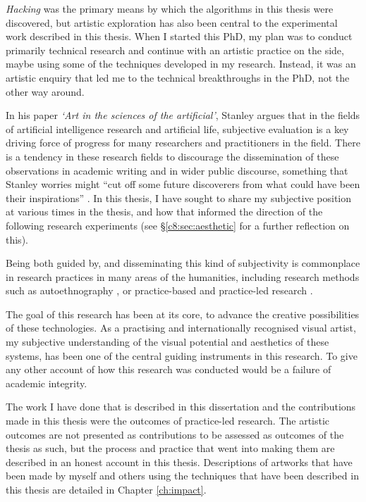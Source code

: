 \textit{Hacking} was the primary means by which the algorithms in this thesis were discovered, but artistic exploration has also been central to the experimental work described in this thesis. 
When I started this PhD, my plan was to conduct primarily technical research and continue with an artistic practice on the side, maybe using some of the techniques developed in my research. 
Instead, it was an artistic enquiry that led me to the technical breakthroughs in the PhD, not the other way around. 

In his paper \textit{`Art in the sciences of the artificial'}, Stanley argues that in the fields of artificial intelligence research and artificial life, subjective evaluation is a key driving force of progress for many researchers and practitioners in the field. 
There is a tendency in these research fields to discourage the dissemination of these observations in academic writing and in wider public discourse, something that Stanley worries might “cut off some future discoverers from what could have been their inspirations” \citep{stanley2018art}. 
In this thesis, I have sought to share my subjective position at various times in the thesis, and how that informed the direction of the following research experiments (see \S \ref{c8:sec:aesthetic} for a further reflection on this).

Being both guided by, and disseminating this kind of subjectivity is commonplace in research practices in many areas of the humanities, including research methods such as autoethnography \citep{reed1997auto}, or practice-based and practice-led research \citep{candy2006practice}. 

The goal of this research has been at its core, to advance the creative possibilities of these technologies. 
As a practising and internationally recognised visual artist, my subjective understanding of the visual potential and aesthetics of these systems, has been one of the central guiding instruments in this research. 
To give any other account of how this research was conducted would be a failure of academic integrity. 

The work  I have done that is described in this dissertation and the contributions made in this thesis were the outcomes of practice-led research. 
The artistic outcomes are not presented as contributions to be assessed as outcomes of the thesis as such, but the process and practice that went into making them are described in an honest account in this thesis. 
Descriptions of artworks that have been made by myself and others using the techniques that have been described in this thesis are detailed in Chapter \ref{ch:impact}.

